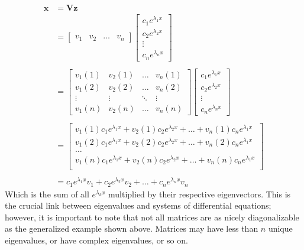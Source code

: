 \documentclass{article}
\begin{document}
\begin{equation*}
    \begin{aligned}
        \mathbf{x} &= \mathbf{Vz}\\
        &= \begin{bmatrix}
            v_1 & v_2 & \dots & v_n
        \end{bmatrix}\begin{bmatrix}
            c_1e^{\lambda_1 x} \\
            c_2 e^{\lambda_2 x} \\
            \vdots \\
            c_ne^{\lambda_n x}
        \end{bmatrix}\\ \\
        &=\begin{bmatrix}
            v_1(1) & v_2(1) & \dots & v_n(1) \\
            v_1(2) & v_2(2) & \dots & v_n(2) \\
            \vdots & \vdots & \ddots & \vdots \\
            v_1(n) & v_2(n) & \dots & v_n(n)
        \end{bmatrix}
        \begin{bmatrix}
        c_1e^{\lambda_1 x} \\
        c_2 e^{\lambda_2 x} \\
        \vdots \\
        c_ne^{\lambda_n x}
        \end{bmatrix}\\ \\
        &=\begin{bmatrix}
            v_1(1)c_1e^{\lambda_1 x} + v_2(1)c_2 e^{\lambda_2 x} + \dots + v_n(1)c_ne^{\lambda_1 x} \\
            v_1(2)c_1e^{\lambda_1 x} + v_2(2)c_2 e^{\lambda_2 x} + \dots + v_n(2)c_ne^{\lambda_1 x} \\
            \dots \\
            v_1(n)c_1e^{\lambda_1 x} + v_2(n)c_2 e^{\lambda_2 x} + \dots + v_n(n)c_ne^{\lambda_1 x} \\
        \end{bmatrix}\\ \\
        &= c_1e^{\lambda_1 x }v_1 + c_2e^{\lambda_2 x}v_2 + \dots + c_ne^{\lambda_n x}v_n
    \end{aligned}
\end{equation*}
Which is the sum of all $e^{\lambda_k x}$ multiplied by their respective eigenvectors. This is the crucial link between eigenvalues and systems of differential equations; however, it is important to note that not all matrices are as nicely diagonalizable as the generalized example shown above. Matrices may have less than $n$ unique eigenvalues, or have complex eigenvalues, or so on. \\ \\
\end{document}
